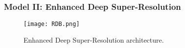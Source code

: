 \subsubsection{Model II: Enhanced Deep Super-Resolution}

\begin{figure} [h!]
	\begin{center}
		\texttt{[image: RDB.png]}
	\end{center}
	\caption{Enhanced Deep Super-Resolution architecture.} 
	\label{fig:EDSR}
\end{figure}
